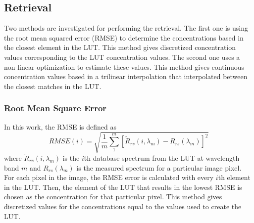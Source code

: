 
\subsection{Retrieval}
Two methods are investigated for performing the retrieval. The first one is using the root mean squared error (RMSE) to determine the concentrations based in the closest element in the LUT. This method gives discretized concentration values corresponding to the LUT concentration values. The second one uses a non-linear optimization to estimate these values. This method gives continuous concentration values based in a trilinear interpolation that interpolated between the closest matches in the LUT.
\subsubsection{Root Mean Square Error}
In this work, the RMSE is defined as
\begin{equation}
  RMSE(i) = \sqrt{\frac{1}{m}\sum_1^m\left[\widetilde{R}_{rs}(i,\lambda_m)-R_{rs}(\lambda_m)\right]^2}
\end{equation}
where $\widetilde{R}_{rs}(i,\lambda_m)$ is the $i$th database spectrum from the LUT at wavelength band $m$ and $R_{rs}(\lambda_m)$ is the measured spectrum for a particular image pixel. For each pixel in the image, the RMSE error is calculated with every $i$th element in the LUT. Then, the element of the LUT that results in the lowest RMSE is chosen as the concentration for that particular pixel. This method gives discretized values for the concentrations equal to the values used to create the LUT.

